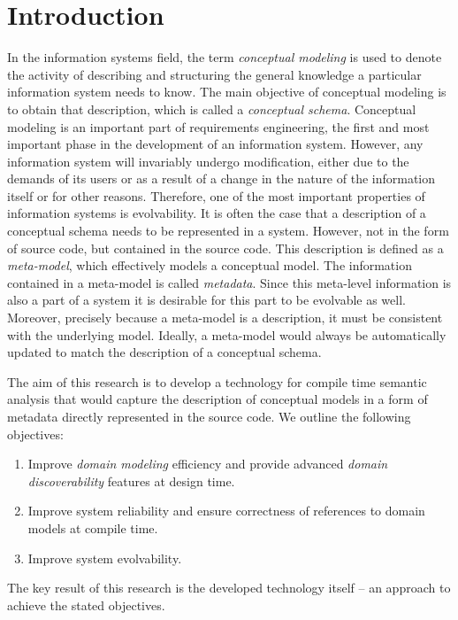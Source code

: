 \chapter{Introduction}

In the information systems field, the term \textit{conceptual modeling} is used to denote the activity of describing and structuring the general knowledge a particular information system needs to know.
The main objective of conceptual modeling is to obtain that description, which is called a \textit{conceptual schema}.
Conceptual modeling is an important part of requirements engineering, the first and most important phase in the development of an information system.
However, any information system will invariably undergo modification, either due to the demands of its users or as a result of a change in the nature of the information itself or for other reasons.
Therefore, one of the most important properties of information systems is evolvability.
It is often the case that a description of a conceptual schema needs to be represented in a system. 
However, not in the form of source code, but contained in the source code.
This description is defined as a \textit{meta-model}, which effectively models a conceptual model.
The information contained in a meta-model is called \textit{metadata}.
Since this meta-level information is also a part of a system it is desirable for this part to be evolvable as well.
Moreover, precisely because a meta-model is a description, it must be consistent with the underlying model.
Ideally, a meta-model would always be automatically updated to match the description of a conceptual schema.

\n

The aim of this research is to develop a technology for compile time semantic analysis that would capture the description of conceptual models in a form of metadata directly represented in the source code. 
We outline the following objectives:
\begin{enumerate}
    \item Improve \textit{domain modeling} efficiency and provide advanced \textit{domain discoverability} features at design time.
    \item Improve system reliability and ensure correctness of references to domain models at compile time.
    \item Improve system evolvability.
\end{enumerate}

The key result of this research is the developed technology itself -- an approach to achieve the stated objectives.

